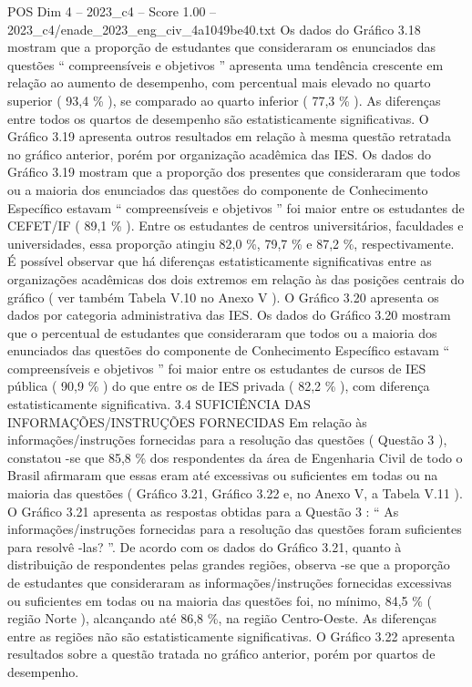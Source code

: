 \begin{textsample}{POS Dim 4 – 2023\_c4 – Score 1.00 – 2023\_c4/enade\_2023\_eng\_civ\_4a1049be40.txt}
Os dados do Gráfico 3.18 mostram que a proporção de estudantes que consideraram os enunciados das questões “ compreensíveis e objetivos ” apresenta uma tendência crescente em relação ao aumento de desempenho, com percentual mais elevado no quarto superior ( 93,4 \% ), se comparado ao quarto inferior ( 77,3 \% ).
As diferenças entre todos os quartos de desempenho são estatisticamente significativas.
O Gráfico 3.19 apresenta outros resultados em relação à mesma questão retratada no gráfico anterior, porém por organização acadêmica das IES.
Os dados do Gráfico 3.19 mostram que a proporção dos presentes que consideraram que todos ou a maioria dos enunciados das questões do componente de Conhecimento Específico estavam “ compreensíveis e objetivos ” foi maior entre os estudantes de CEFET/IF ( 89,1 \% ).
Entre os estudantes de centros universitários, faculdades e universidades, essa proporção atingiu 82,0 \%, 79,7 \% e 87,2 \%, respectivamente.
É possível observar que há diferenças estatisticamente significativas entre as organizações acadêmicas dos dois extremos em relação às das posições centrais do gráfico ( ver também Tabela V.10 no Anexo V ).
O Gráfico 3.20 apresenta os dados por categoria administrativa das IES.
Os dados do Gráfico 3.20 mostram que o percentual de estudantes que consideraram que todos ou a maioria dos enunciados das questões do componente de Conhecimento Específico estavam “ compreensíveis e objetivos ” foi maior entre os estudantes de cursos de IES pública ( 90,9 \% ) do que entre os de IES privada ( 82,2 \% ), com diferença estatisticamente significativa. 3.4 SUFICIÊNCIA DAS INFORMAÇÕES/INSTRUÇÕES FORNECIDAS Em relação às informações/instruções fornecidas para a resolução das questões ( Questão 3 ), constatou -se que 85,8 \% dos respondentes da área de Engenharia Civil de todo o Brasil afirmaram que essas eram até excessivas ou suficientes em todas ou na maioria das questões ( Gráfico 3.21, Gráfico 3.22 e, no Anexo V, a Tabela V.11 ).
O Gráfico 3.21 apresenta as respostas obtidas para a Questão 3 : “ As informações/instruções fornecidas para a resolução das questões foram suficientes para resolvê -las? ”.
De acordo com os dados do Gráfico 3.21, quanto à distribuição de respondentes pelas grandes regiões, observa -se que a proporção de estudantes que consideraram as informações/instruções fornecidas excessivas ou suficientes em todas ou na maioria das questões foi, no mínimo, 84,5 \% ( região Norte ), alcançando até 86,8 \%, na região Centro-Oeste.
As diferenças entre as regiões não são estatisticamente significativas.
O Gráfico 3.22 apresenta resultados sobre a questão tratada no gráfico anterior, porém por quartos de desempenho.

\end{textsample}
